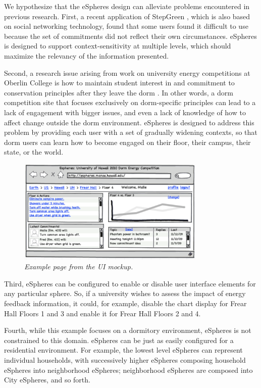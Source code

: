 We hypothesize that the eSpheres design can alleviate problems
encountered in previous research.  First, a recent application of StepGreen
\cite{Grevet10}, which is also based on social networking technology, found
that some users found it difficult to use because the set of commitments
did not reflect their own circumstances.  eSpheres is designed to support
context-sensitivity at multiple levels, which should maximize the relevancy
of the information presented.

Second, a research issue arising from work on university energy
competitions at Oberlin College is how to maintain student interest in and
commitment to conservation principles after they leave the dorm
\cite{Peterson09}.  In other words, a dorm competition site that focuses
exclusively on dorm-specific principles can lead to a lack of engagement
with bigger issues, and even a lack of knowledge of how to affect change
outside the dorm environment.  eSpheres is designed to address this problem
by providing each user with a set of gradually widening contexts, so that
dorm users can learn how to become engaged on their floor, their campus,
their state, or the world.

\begin{figure}[th]
  \center
  \includegraphics[width=0.8\textwidth]{esphere-mockup.eps}
  \caption{\em \small Example page from the UI mockup.}
 \label{fig:esphere-mockup}
\end{figure} 

Third, eSpheres can be configured to enable or disable user interface
elements for any particular sphere.  So, if a university wishes to assess
the impact of energy feedback information, it could, for example, disable
the chart display for Frear Hall Floors 1 and 3 and enable it for Frear
Hall Floors 2 and 4.

Fourth, while this example focuses on a dormitory environment, eSpheres is
not constrained to this domain.  eSpheres can be just as easily configured
for a residential environment.  For example, the lowest level eSpheres can
represent individual households, with successively higher eSpheres
composing household eSpheres into neighborhood eSpheres; neighborhood
eSpheres are composed into City eSpheres, and so forth.

